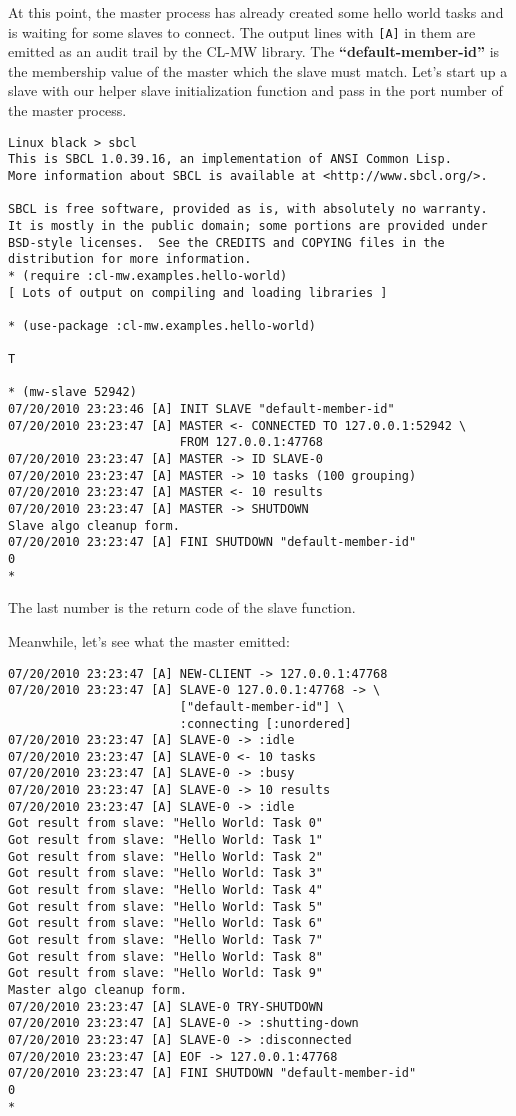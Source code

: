 \documentclass[titlepage,12pt]{book}
\newcommand{\xsmall}{\latexhtml{\small}{}}
\newcommand{\xnormalsize}{\latexhtml{\normalsize}{}}
\newcommand{\clmw}{\xsmall\textsc{CL-MW}\xnormalsize\xspace}
\newcommand{\bold}[1]{\textbf{#1}\xspace}
\begin{document}
At this point, the master process has already created some hello
world tasks and is waiting for some slaves to connect. The output
lines with \texttt{[A]} in them are emitted as an audit trail by the
\clmw library.  The \bold{``default-member-id''} is the membership
value of the master which the slave must match. Let's start up a slave
with our helper slave initialization function and pass in the port
number of the master process.

\small
\begin{verbatim}
Linux black > sbcl
This is SBCL 1.0.39.16, an implementation of ANSI Common Lisp.
More information about SBCL is available at <http://www.sbcl.org/>.

SBCL is free software, provided as is, with absolutely no warranty.
It is mostly in the public domain; some portions are provided under
BSD-style licenses.  See the CREDITS and COPYING files in the
distribution for more information.
* (require :cl-mw.examples.hello-world)
[ Lots of output on compiling and loading libraries ]

* (use-package :cl-mw.examples.hello-world)

T

* (mw-slave 52942)
07/20/2010 23:23:46 [A] INIT SLAVE "default-member-id"
07/20/2010 23:23:47 [A] MASTER <- CONNECTED TO 127.0.0.1:52942 \
                        FROM 127.0.0.1:47768
07/20/2010 23:23:47 [A] MASTER -> ID SLAVE-0
07/20/2010 23:23:47 [A] MASTER -> 10 tasks (100 grouping)
07/20/2010 23:23:47 [A] MASTER <- 10 results
07/20/2010 23:23:47 [A] MASTER -> SHUTDOWN
Slave algo cleanup form.
07/20/2010 23:23:47 [A] FINI SHUTDOWN "default-member-id"
0
* 
\end{verbatim}
\normalsize

The last number is the return code of the slave function.

Meanwhile, let's see what the master emitted:

\small
\begin{verbatim}
07/20/2010 23:23:47 [A] NEW-CLIENT -> 127.0.0.1:47768
07/20/2010 23:23:47 [A] SLAVE-0 127.0.0.1:47768 -> \
                        ["default-member-id"] \
                        :connecting [:unordered]
07/20/2010 23:23:47 [A] SLAVE-0 -> :idle
07/20/2010 23:23:47 [A] SLAVE-0 <- 10 tasks
07/20/2010 23:23:47 [A] SLAVE-0 -> :busy
07/20/2010 23:23:47 [A] SLAVE-0 -> 10 results
07/20/2010 23:23:47 [A] SLAVE-0 -> :idle
Got result from slave: "Hello World: Task 0"
Got result from slave: "Hello World: Task 1"
Got result from slave: "Hello World: Task 2"
Got result from slave: "Hello World: Task 3"
Got result from slave: "Hello World: Task 4"
Got result from slave: "Hello World: Task 5"
Got result from slave: "Hello World: Task 6"
Got result from slave: "Hello World: Task 7"
Got result from slave: "Hello World: Task 8"
Got result from slave: "Hello World: Task 9"
Master algo cleanup form.
07/20/2010 23:23:47 [A] SLAVE-0 TRY-SHUTDOWN
07/20/2010 23:23:47 [A] SLAVE-0 -> :shutting-down
07/20/2010 23:23:47 [A] SLAVE-0 -> :disconnected
07/20/2010 23:23:47 [A] EOF -> 127.0.0.1:47768
07/20/2010 23:23:47 [A] FINI SHUTDOWN "default-member-id"
0
*
\end{verbatim}
\normalsize
\end{document}
